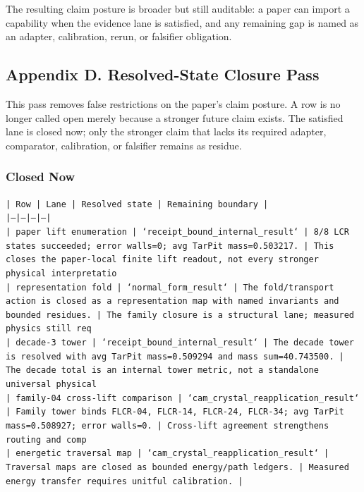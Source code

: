 \documentclass[11pt]{article}
\begin{document}
The resulting claim posture is broader but still auditable: a paper can import a capability when the evidence lane is satisfied, and any remaining gap is named as an adapter, calibration, rerun, or falsifier obligation.

\subsection*{Appendix D. Resolved-State Closure Pass}

This pass removes false restrictions on the paper's claim posture. A row is no longer called open merely because a stronger future claim exists. The satisfied lane is closed now; only the stronger claim that lacks its required adapter, comparator, calibration, or falsifier remains as residue.

\subsubsection*{Closed Now}

\noindent\texttt{| Row | Lane | Resolved state | Remaining boundary |}\\
\noindent\texttt{|---|---|---|---|}\\
\noindent\texttt{| paper lift enumeration | `receipt\_bound\_internal\_result` | 8/8 LCR states succeeded; error walls=0; avg TarPit mass=0.503217. | This closes the paper-local finite lift readout, not every stronger physical interpretatio}\\
\noindent\texttt{| representation fold | `normal\_form\_result` | The fold/transport action is closed as a representation map with named invariants and bounded residues. | The family closure is a structural lane; measured physics still req}\\
\noindent\texttt{| decade-3 tower | `receipt\_bound\_internal\_result` | The decade tower is resolved with avg TarPit mass=0.509294 and mass sum=40.743500. | The decade total is an internal tower metric, not a standalone universal physical }\\
\noindent\texttt{| family-04 cross-lift comparison | `cam\_crystal\_reapplication\_result` | Family tower binds FLCR-04, FLCR-14, FLCR-24, FLCR-34; avg TarPit mass=0.508927; error walls=0. | Cross-lift agreement strengthens routing and comp}\\
\noindent\texttt{| energetic traversal map | `cam\_crystal\_reapplication\_result` | Traversal maps are closed as bounded energy/path ledgers. | Measured energy transfer requires unitful calibration. |}\\
\end{document}

